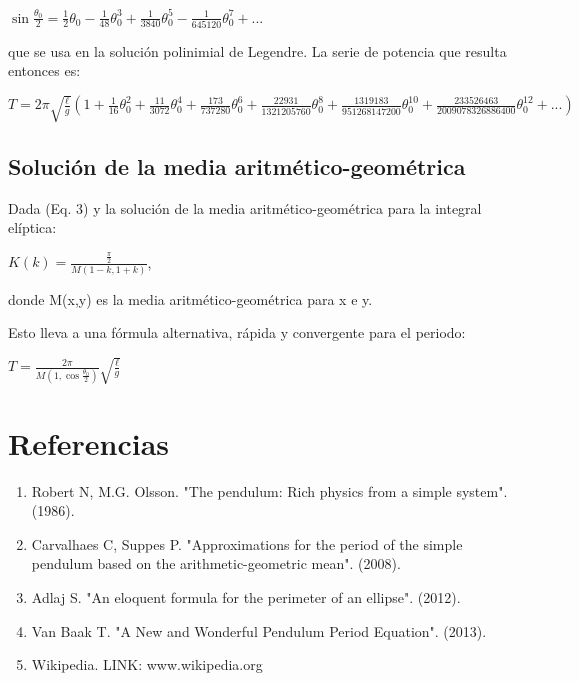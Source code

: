 \documentclass[12pt]{article}
\begin{document}
$\sin{\frac{\theta_0}{2}}=\frac{1}{2}\theta_0-\frac{1}{48}\theta_0^3+\frac{1}{3840}\theta_0^5-\frac{1}{645120}\theta_0^7+...$

que se usa en la solución polinimial de Legendre. La serie de potencia que resulta entonces es:

$T=2\pi\sqrt{\frac{\ell}{g}}\left(1+\frac{1}{16}\theta_0^2+\frac{11}{3072}\theta_0^4+\frac{173}{737280}\theta_0^6+\frac{22931}{1321205760}\theta_0^8+\frac{1319183}{951268147200}\theta_0^{10}+\frac{233526463}{2009078326886400}\theta_0^{12}+...\right)$

\subsection{Solución de la media aritmético-geométrica}
Dada (Eq. 3) y la solución de la media aritmético-geométrica para la integral elíptica:

$K(k)=\frac{\frac{\pi}{2}}{M(1-k,1+k)}$, 

\noindent donde M(x,y) es la media aritmético-geométrica para x e y.

Esto lleva a una fórmula alternativa, rápida y convergente para el periodo:

$T=\frac{2\pi}{M(1, \cos{\frac{\theta_0}{2}})}\sqrt{\frac{\ell}{g}}$

\section{Referencias}
\begin{enumerate}
\item Robert N, M.G. Olsson. "The pendulum: Rich physics from a simple system". (1986).
\item Carvalhaes C, Suppes P. "Approximations for the period of the simple pendulum based on the arithmetic-geometric mean". (2008).
\item Adlaj S. "An eloquent formula for the perimeter of an ellipse". (2012).
\item Van Baak T. "A New and Wonderful Pendulum Period Equation". (2013).
\item Wikipedia. LINK: www.wikipedia.org
\end{enumerate}
\end{document}
